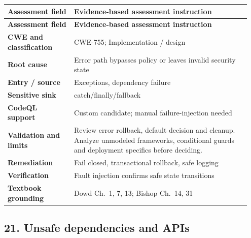 \documentclass[11pt,letterpaper,oneside]{book}
\begin{document}
\small
\setlength{\tabcolsep}{2pt}
\renewcommand{\arraystretch}{1.18}
\begin{longtable}{>{\raggedright\arraybackslash}p{0.26\linewidth}>{\raggedright\arraybackslash}p{0.69\linewidth}}
\toprule
\textbf{Assessment field} & \textbf{Evidence-based assessment instruction}\\
\midrule
\endfirsthead
\toprule
\textbf{Assessment field} & \textbf{Evidence-based assessment instruction}\\
\midrule
\endhead
\textbf{CWE and classification} & CWE-755; Implementation / design\\
\textbf{Root cause} & Error path bypasses policy or leaves invalid security state\\
\textbf{Entry / source} & Exceptions, dependency failure\\
\textbf{Sensitive sink} & catch/finally/fallback\\
\textbf{CodeQL support} & Custom candidate; manual failure-injection needed\\
\textbf{Validation and limits} & Review error rollback, default decision and cleanup. Analyze unmodeled frameworks, conditional guards and deployment specifics before deciding.\\
\textbf{Remediation} & Fail closed, transactional rollback, safe logging\\
\textbf{Verification} & Fault injection confirms safe state transitions\\
\textbf{Textbook grounding} & Dowd Ch.~1, 7, 13; Bishop Ch.~14, 31\\
\bottomrule
\end{longtable}
\normalsize

\subsection{21. Unsafe dependencies and APIs}
\end{document}
